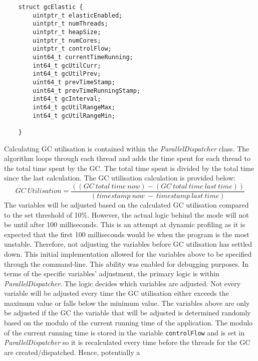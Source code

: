 \begin{verbatim}
    struct gcElastic {
        uintptr_t elasticEnabled; 
        uintptr_t numThreads;
        uintptr_t heapSize;
        uintptr_t numCores;
        uintptr_t controlFlow;
        uint64_t currentTimeRunning;
        int64_t gcUtilCurr;
        int64_t gcUtilPrev;
        uint64_t prevTimeStamp;
        uint64_t prevTimeRunningStamp;
        int64_t gcInterval;
        int64_t gcUtilRangeMax; 
        int64_t gcUtilRangeMin; 
        
    }
\end{verbatim}
Calculating GC utilisation is contained within the \emph{ParallelDispatcher}
class. The algorithm loops through each thread and adds the time spent
for each thread to the total time spent by the GC. The total time spent
is divided by the total time since the last calculation. The GC utilisation calculation is provided below:
\newline\newline
\[GC \ Utilisation = \frac{((GC \ total \ time \ now) -  (GC\ total\ time\ last\ time))}{ (timestamp\ now\ -\ timestamp\ last\ time)}\]   
\newline\newline
The variables
will be adjusted based on the calculated GC utilisation compared to the
set threshold of 10\%. However, the actual logic behind the mode will
not be until after 100 milliseconds. This is an attempt at dynamic
profiling as it is expected that the first 100 milliseconds would be
when the program is the most unstable. Therefore, not adjusting the
variables before GC utilisation has settled down. This initial
implementation allowed for the variables above to be specified through
the command-line. This ability was enabled for debugging purposes.
\newline\newline
In
terms of the specific variables' adjustment, the primary logic is within
\emph{ParallelDispatcher}. The logic decides which variables are adjusted. Not
every variable will be adjusted every time the GC utilisation either
exceeds the maximum value or falls below the minimum value. The
variables above are only be adjusted if the GC the variable that will
be adjusted is determined randomly based on the modulo of the current
running time of the application. The modulo of the current running time
is stored in the variable \verb|controlFlow| and is set in
\emph{ParallelDispatcher} so it is recalculated every time before the
threads for the GC are created/dispatched. Hence, potentially a
